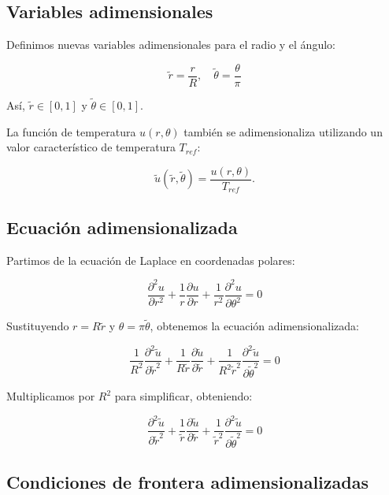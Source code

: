 \subsection{Variables adimensionales}

Definimos nuevas variables adimensionales para el radio y el ángulo:

\[
\tilde{r} = \frac{r}{R}, \quad \tilde{\theta} = \frac{\theta}{\pi}
\]

Así, \( \tilde{r} \in [0, 1] \) y \( \tilde{\theta} \in [0, 1] \).

La función de temperatura \( u(r, \theta) \) también se adimensionaliza utilizando un valor característico de temperatura \( T_{ref} \):

\[
\tilde{u}(\tilde{r}, \tilde{\theta}) = \frac{u(r, \theta)}{T_{ref}}.
\]

\subsection{Ecuación adimensionalizada}

Partimos de la ecuación de Laplace en coordenadas polares:

\begin{equation}
    \frac{\partial^2 u}{\partial r^2} + \frac{1}{r} \frac{\partial u}{\partial r} + \frac{1}{r^2} \frac{\partial^2 u}{\partial \theta^2} = 0
\end{equation}

Sustituyendo \( r = R \tilde{r} \) y \( \theta = \pi \tilde{\theta} \), obtenemos la ecuación adimensionalizada:

\begin{equation}
    \frac{1}{R^2} \frac{\partial^2 \tilde{u}}{\partial \tilde{r}^2} + \frac{1}{R \tilde{r}} \frac{\partial \tilde{u}}{\partial \tilde{r}} + \frac{1}{R^2 \tilde{r}^2} \frac{\partial^2 \tilde{u}}{\partial \tilde{\theta}^2} = 0
\end{equation}

Multiplicamos por \( R^2 \) para simplificar, obteniendo:

\begin{equation}
    \frac{\partial^2 \tilde{u}}{\partial \tilde{r}^2} + \frac{1}{\tilde{r}} \frac{\partial \tilde{u}}{\partial \tilde{r}} + \frac{1}{\tilde{r}^2} \frac{\partial^2 \tilde{u}}{\partial \tilde{\theta}^2} = 0
\end{equation}

\subsection{Condiciones de frontera adimensionalizadas}

